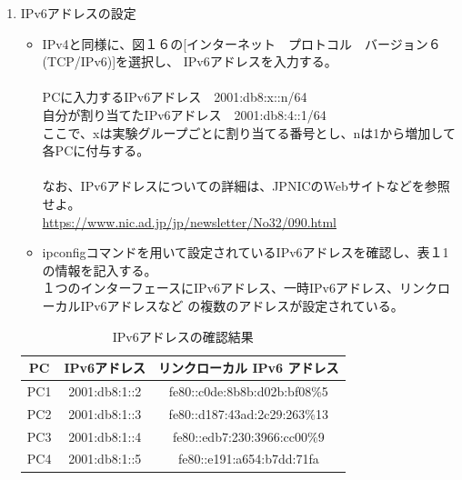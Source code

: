 \documentclass[10pt]{article}
\begin{document}
\begin{enumerate}
    \item IPv6アドレスの設定
        \begin{itemize}
            \item IPv4と同様に、図１６の[インターネット　プロトコル　バージョン６(TCP/IPv6)]を選択し、
                IPv6アドレスを入力する。\\\\
                PCに入力するIPv6アドレス　2001:db8:x::n/64 \\
                自分が割り当てたIPv6アドレス　2001:db8:4::1/64 \\
                \text{*}ここで、xは実験グループごとに割り当てる番号とし、nは1から増加して各PCに付与する。\\\\
                なお、IPv6アドレスについての詳細は、JPNICのWebサイトなどを参照せよ。\\
                \underline{https://www.nic.ad.jp/jp/newsletter/No32/090.html}
            \item ipconfigコマンドを用いて設定されているIPv6アドレスを確認し、表１1の情報を記入する。 \\
                １つのインターフェースにIPv6アドレス、一時IPv6アドレス、リンクローカルIPv6アドレスなど
                の複数のアドレスが設定されている。 
        \end{itemize}
                \begingroup
                \setlength{\tabcolsep}{5pt} %
                \renewcommand{\arraystretch}{1.5} %
                    \begin{table}[H]
                    \centering
                	\caption{IPv6アドレスの確認結果 }
                	\begin{tabular}{|c|c|c|}
                	    \hline
                	    PC & IPv6アドレス & リンクローカル IPv6 アドレス \\[0.5ex]
                		\hline\hline
                    	PC1 & 2001:db8:1::2 & fe80::c0de:8b8b:d02b:bf08\%5 \\ \hline
                    	PC2 & 2001:db8:1::3 & fe80::d187:43ad:2c29:263\%13 \\ \hline
                    	PC3 & 2001:db8:1::4 & fe80::edb7:230:3966:cc00\%9 \\ \hline
                    	PC4 & 2001:db8:1::5 & fe80::e191:a654:b7dd:71fa \\ \hline
                	\end{tabular}

\end{table}
\end{enumerate}
\end{document}
